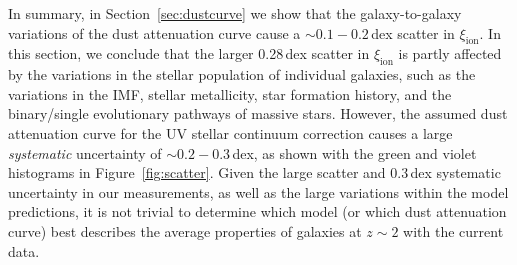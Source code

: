 \documentclass[iop]{emulateapj}
\newcommand{\xiion}{\ensuremath{\xi_{\mathrm{ion}}}}
\begin{document}
In summary, in Section~\ref{sec:dustcurve} we show that the galaxy-to-galaxy variations of the dust attenuation curve cause a $\sim 0.1-0.2$\,dex scatter in {\xiion}. In this section, we conclude that the larger 0.28\,dex scatter in {\xiion} is partly affected by the variations in the stellar population of individual galaxies, such as the variations in the IMF, stellar metallicity, star formation history, and the binary/single evolutionary pathways of massive stars. However, the assumed dust attenuation curve for the UV stellar continuum correction causes a large {\em systematic} uncertainty of $\sim 0.2-0.3$\,dex, as shown with the green and violet histograms in Figure~\ref{fig:scatter}. Given the large scatter and 0.3\,dex systematic uncertainty in our measurements, as well as the large variations within the model predictions, it is not trivial to determine which model (or which dust attenuation curve) best describes the average properties of galaxies at $z\sim 2$ with the current data. 
\end{document}

